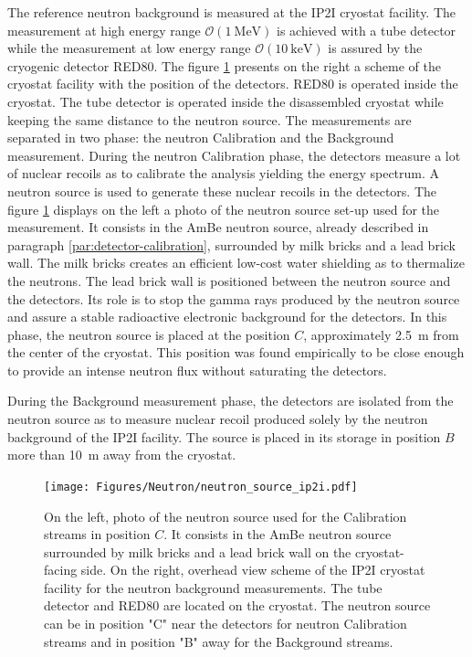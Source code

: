 The reference neutron background is measured at the IP2I cryostat facility. The measurement at high energy range $\mathcal{O}(\SI{1}{\mega\eV})$ is achieved with a  tube detector while the measurement at low energy range $\mathcal{O}(\SI{10}{\kilo\eV})$ is assured by the cryogenic detector RED80. The figure \ref{fig:scheme-ip2i} presents on the right a scheme of the cryostat facility with the position of the detectors. RED80 is operated inside the cryostat. The  tube detector is operated inside the disassembled cryostat while keeping the same distance to the neutron source.
The measurements are separated in two phase: the neutron Calibration and the Background measurement.
During the neutron Calibration phase, the detectors measure a lot of nuclear recoils as to calibrate the analysis yielding the energy spectrum. A neutron source is used to generate these nuclear recoils in the detectors. The figure \ref{fig:scheme-ip2i} displays on the left a photo of the neutron source set-up used for the measurement. It consists in the AmBe neutron source, already described in paragraph \ref{par:detector-calibration}, surrounded by milk bricks and a lead brick wall. The milk bricks creates an efficient low-cost water shielding as to thermalize the neutrons. The lead brick wall is positioned between the neutron source and the detectors. Its role is to stop the gamma rays produced by the neutron source and assure a stable radioactive electronic background for the detectors.
In this phase, the neutron source is placed at the position $C$, approximately \SI{2.5}{\meter} from the center of the cryostat. This position was found empirically to be close enough to provide an intense neutron flux without saturating the detectors.

During the Background measurement phase, the detectors are isolated from the neutron source as to measure nuclear recoil produced solely by the neutron background of the IP2I facility. The source is placed in its storage in position $B$ more than \SI{10}{\m} away from the cryostat.

\begin{figure}
\centering
\texttt{[image: Figures/Neutron/neutron\_source\_ip2i.pdf]}
\caption{On the left, photo of the neutron source used for the Calibration streams in position $C$. It consists in the AmBe neutron source surrounded by milk bricks and a lead brick wall on the cryostat-facing side. On the right, overhead view scheme of the IP2I cryostat facility for the neutron background measurements. The  tube detector and RED80 are located on the cryostat. The neutron source can be in position "C"  near the detectors for neutron Calibration streams and in position "B" away for the Background streams.}
\label{fig:scheme-ip2i}
\end{figure}

